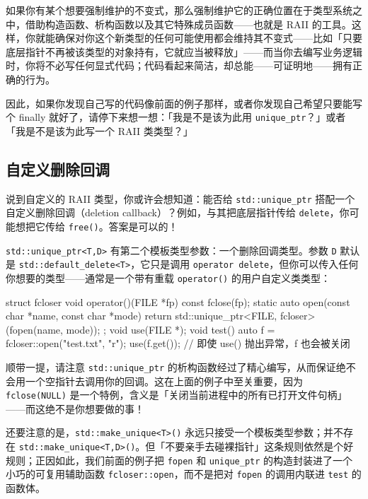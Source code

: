 如果你有某个想要强制维护的不变式，那么强制维护它的正确位置在于类型系统之中，借助构造函数、析构函数以及其它特殊成员函数——也就是 RAII 的工具。这样，你就能确保对你这个新类型的任何可能使用都会维持其不变式——比如「只要底层指针不再被该类型的对象持有，它就应当被释放」——而当你去编写业务逻辑时，你将不必写任何显式代码；代码看起来简洁，却总能——可证明地——拥有正确的行为。

因此，如果你发现自己写的代码像前面的例子那样，或者你发现自己希望只要能写个 finally 就好了，请停下来想一想：「我是不是该为此用 \texttt{unique\_\allowbreak{}ptr}？」或者「我是不是该为此写一个 RAII 类类型？」

\subsection{自定义删除回调}

说到自定义的 RAII 类型，你或许会想知道：能否给 \texttt{std::\allowbreak{}unique\_\allowbreak{}ptr} 搭配一个自定义删除回调（deletion callback）？例如，与其把底层指针传给 \texttt{delete}，你可能想把它传给 \texttt{free(\allowbreak{})\allowbreak{}}。答案是可以的！

\texttt{std::\allowbreak{}unique\_\allowbreak{}ptr<\allowbreak{}T,\allowbreak{}D>\allowbreak{}} 有第二个模板类型参数：一个删除回调类型。参数 \texttt{D} 默认是 \texttt{std::\allowbreak{}default\_\allowbreak{}delete<\allowbreak{}T>\allowbreak{}}，它只是调用 \texttt{operator delete}，但你可以传入任何你想要的类型——通常是一个带有重载 \texttt{operator(\allowbreak{})\allowbreak{}} 的用户自定义类类型：

\begin{codebox}[cpp]
    struct fcloser {
      void operator()(FILE *fp) const {
        fclose(fp);
      }
      static auto open(const char *name, const char *mode) {
        return std::unique_ptr<FILE, fcloser>(fopen(name, mode));
      }
    };
    void use(FILE *);
    void test() {
      auto f = fcloser::open("test.txt", "r");
      use(f.get());
      // 即使 use() 抛出异常，f 也会被关闭
    }
\end{codebox}

顺带一提，请注意 \texttt{std::\allowbreak{}unique\_\allowbreak{}ptr} 的析构函数经过了精心编写，从而保证绝不会用一个空指针去调用你的回调。这在上面的例子中至关重要，因为 \texttt{fclose(\allowbreak{}NULL)\allowbreak{}} 是一个特例，含义是「关闭当前进程中的所有已打开文件句柄」——而这绝不是你想要做的事！

还要注意的是，\texttt{std::\allowbreak{}make\_\allowbreak{}unique<\allowbreak{}T>\allowbreak{}(\allowbreak{})\allowbreak{}} 永远只接受一个模板类型参数；并不存在 \texttt{std::\allowbreak{}make\_\allowbreak{}unique<\allowbreak{}T,\allowbreak{}D>\allowbreak{}(\allowbreak{})\allowbreak{}}。但「不要亲手去碰裸指针」这条规则依然是个好规则；正因如此，我们前面的例子把 \texttt{fopen} 和 \texttt{unique\_\allowbreak{}ptr} 的构造封装进了一个小巧的可复用辅助函数 \texttt{fcloser::\allowbreak{}open}，而不是把对 \texttt{fopen} 的调用内联进 \texttt{test} 的函数体。

